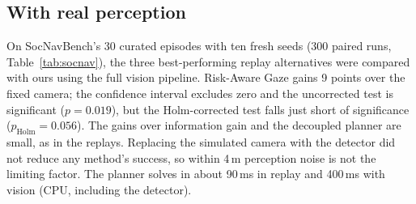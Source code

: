 \documentclass[letterpaper, 10 pt, conference]{ieeeconf}
\begin{document}
\subsection{With real perception}
On SocNavBench's 30 curated episodes with ten fresh seeds (300 paired runs, Table~\ref{tab:socnav}), the three best-performing replay alternatives were compared with ours using the full vision pipeline. Risk-Aware Gaze gains 9 points over the fixed camera; the confidence interval excludes zero and the uncorrected test is significant ($p{=}0.019$), but the Holm-corrected test falls just short of significance ($p_\text{Holm}{=}0.056$). The gains over information gain and the decoupled planner are small, as in the replays. Replacing the simulated camera with the detector did not reduce any method's success, so within 4\,m perception noise is not the limiting factor. The planner solves in about 90\,ms in replay and 400\,ms with vision (CPU, including the detector).

\begin{table}[t]
\centering
\caption{SocNavBench with RGB-D vision, 300 paired runs. Fractions of runs ending in a collision with an undetected and with a detected pedestrian (the remainder, at most two per method, are timeouts); difference to ours with 95\% cluster-bootstrap CI; one-sided episode-level permutation test, Holm-corrected.}
\label{tab:socnav}
\footnotesize
\setlength{\tabcolsep}{3.5pt}
\end{table}
\end{document}
